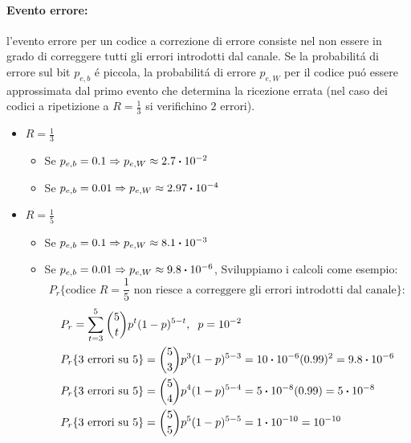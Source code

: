             \paragraph{Evento errore:} l'evento errore per un codice a correzione di errore consiste nel non essere in grado di correggere
            tutti gli errori introdotti dal canale. Se la probabilitá di errore sul bit $p_{e,b}$ é piccola, la probabilitá di errore 
            $p_{e,W}$ per il codice puó essere approssimata dal primo evento che determina la ricezione errata (nel caso dei codici a ripetizione a $R = \frac{1}{3}$ 
            si verifichino $2$ errori).
            \begin{itemize}
                \item {$R = \frac{1}{3}$
                    \begin{itemize}
                        \item {
                            Se $p_{e,b} = 0.1 \Rightarrow p_{e,W} \approx 2.7\dotproduct 10^{-2} $ 
                        }
                        \item {
                            Se $p_{e,b} = 0.01 \Rightarrow p_{e,W} \approx 2.97\dotproduct 10^{-4} $ 
                        }
                    \end{itemize}
                }
                \item {$R = \frac{1}{5}$
                    \begin{itemize}
                        \item {
                            Se $p_{e,b} = 0.1 \Rightarrow p_{e,W} \approx 8.1\dotproduct 10^{-3} $ 
                        }
                        \item {
                            Se $p_{e,b} = 0.01 \Rightarrow p_{e,W} \approx 9.8\dotproduct 10^{-6} $, Sviluppiamo i calcoli come esempio: 
                            \[
                                P_r \{\text{codice }R=\frac{1}{5}\text{ non riesce a correggere gli errori introdotti dal canale}\}:
                            \]
                            \begin{align}
                                P_r &= \sum_{t=3}^{5} \binom{5}{t}p^t (1-p)^{5-t},\hspace{0.2cm} p=10^{-2} \nonumber \\
                                P_r &\{\text{3 errori su 5}\}= \binom{5}{3}p^3 (1-p)^{5-3} = 10\dotproduct 10^{-6} (0.99)^2 = 9.8\dotproduct 10^{-6} \nonumber \\
                                P_r &\{\text{3 errori su 5}\}= \binom{5}{4}p^4 (1-p)^{5-4} = 5\dotproduct 10^{-8} (0.99) = 5\dotproduct 10^{-8}\nonumber \\
                                P_r &\{\text{3 errori su 5}\}= \binom{5}{5}p^5 (1-p)^{5-5} = 1\dotproduct 10^{-10} = 10^{-10}\nonumber 
                            \end{align}
                        }
                    \end{itemize}
                }
            \end{itemize}

